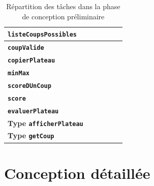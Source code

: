 \documentclass[11pt]{report}
\begin{document}
\begin{table}[h]
\begin{center}
\begin{tabular}{|l|c|c|c|c|c|}
 		 		 		\textbf{\texttt{listeCoupsPossibles}} & & & &  \cellcolor{lightgray}&  \cellcolor{lightgray}  \\\hline
 		  		\textbf{\texttt{coupValide}} & & & &  \cellcolor{lightgray}&  \cellcolor{lightgray}  \\\hline
  		\textbf{\texttt{copierPlateau}} & & & &  \cellcolor{lightgray}&  \cellcolor{lightgray}  \\\hline
   		\textbf{\texttt{minMax}} & & & &  \cellcolor{lightgray}&  \cellcolor{lightgray}  \\\hline
   		 		\textbf{\texttt{scoreDUnCoup}} & & & &  \cellcolor{lightgray}&  \cellcolor{lightgray}  \\\hline
   	 		\textbf{\texttt{score}} & & & &  \cellcolor{lightgray}&  \cellcolor{lightgray}  \\\hline
   	 		 		\textbf{\texttt{evaluerPlateau}} & & & &  \cellcolor{lightgray}&  \cellcolor{lightgray}  \\\hline
   	\textbf{Type \texttt{afficherPlateau}} & \cellcolor{lightgray} & \cellcolor{lightgray} & \cellcolor{lightgray} & & \\\hline
   	 		 \textbf{Type \texttt{getCoup}} & & & & \cellcolor{lightgray}& \cellcolor{lightgray}\\\hline
\end{tabular}
\end{center}
\caption{Répartition des tâches dans la phase de conception préliminaire}
\end{table}

\chapter{Conception détaillée}
\end{document}
